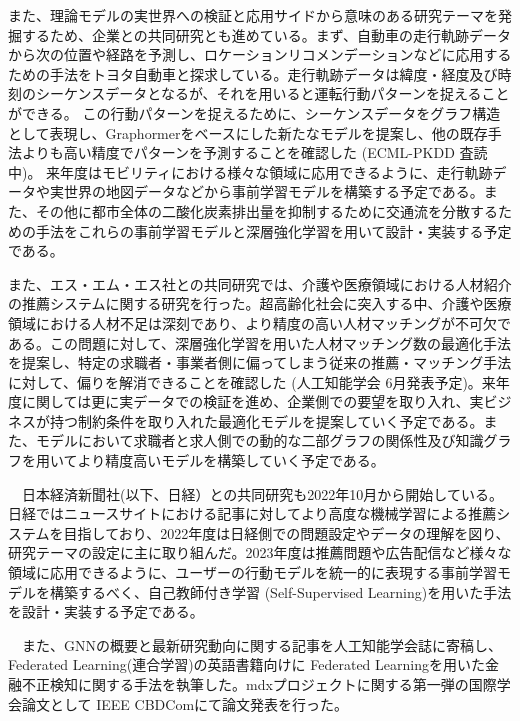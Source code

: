 また、理論モデルの実世界への検証と応用サイドから意味のある研究テーマを発掘するため、企業との共同研究とも進めている。まず、自動車の走行軌跡データから次の位置や経路を予測し、ロケーションリコメンデーションなどに応用するための手法をトヨタ自動車と探求している。走行軌跡データは緯度・経度及び時刻のシーケンスデータとなるが、それを用いると運転行動パターンを捉えることができる。
この行動パターンを捉えるために、シーケンスデータをグラフ構造として表現し、Graphormerをベースにした新たなモデルを提案し、他の既存手法よりも高い精度でパターンを予測することを確認した (ECML-PKDD \cite{stgtrans} 査読中)。
来年度はモビリティにおける様々な領域に応用できるように、走行軌跡データや実世界の地図データなどから事前学習モデルを構築する予定である。また、その他に都市全体の二酸化炭素排出量を抑制するために交通流を分散するための手法をこれらの事前学習モデルと深層強化学習を用いて設計・実装する予定である。

また、エス・エム・エス社との共同研究では、介護や医療領域における人材紹介の推薦システムに関する研究を行った。超高齢化社会に突入する中、介護や医療領域における人材不足は深刻であり、より精度の高い人材マッチングが不可欠である。この問題に対して、深層強化学習を用いた人材マッチング数の最適化手法を提案し、特定の求職者・事業者側に偏ってしまう従来の推薦・マッチング手法に対して、偏りを解消できることを確認した (人工知能学会\cite{sms} 6月発表予定)。来年度に関しては更に実データでの検証を進め、企業側での要望を取り入れ、実ビジネスが持つ制約条件を取り入れた最適化モデルを提案していく予定である。また、モデルにおいて求職者と求人側での動的な二部グラフの関係性及び知識グラフを用いてより精度高いモデルを構築していく予定である。

　日本経済新聞社(以下、日経）との共同研究も2022年10月から開始している。日経ではニュースサイトにおける記事に対してより高度な機械学習による推薦システムを目指しており、2022年度は日経側での問題設定やデータの理解を図り、研究テーマの設定に主に取り組んだ。2023年度は推薦問題や広告配信など様々な領域に応用できるように、ユーザーの行動モデルを統一的に表現する事前学習モデルを構築するべく、自己教師付き学習 (Self-Supervised Learning)を用いた手法を設計・実装する予定である。

　また、GNNの概要と最新研究動向に関する記事を人工知能学会誌\cite{jsai-gnn}に寄稿し、Federated Learning(連合学習)の英語書籍向けに Federated Learningを用いた金融不正検知に関する手法を執筆した\cite{fl-book}。mdxプロジェクトに関する第一弾の国際学会論文として IEEE CBDCom\cite{mdx}にて論文発表を行った。


